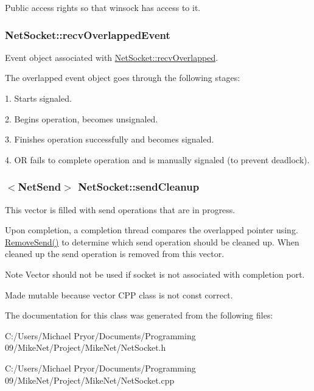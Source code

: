 Public access rights so that winsock has access to it. \hypertarget{class_net_socket_aeeae305cd0382ee87cf9c35aec571719}{
\subsubsection[{recvOverlappedEvent}]{ {\bf NetSocket::recvOverlappedEvent}}}
\label{class_net_socket_aeeae305cd0382ee87cf9c35aec571719}


Event object associated with \hyperlink{class_net_socket_ac260f690a6f192c22463d1f5ea903d96}{NetSocket::recvOverlapped}. 

The overlapped event object goes through the following stages: \par
 1. Starts signaled. \par
 2. Begins operation, becomes unsignaled. \par
 3. Finishes operation successfully and becomes signaled. \par
 4. OR fails to complete operation and is manually signaled (to prevent deadlock). \par
\par
 \hypertarget{class_net_socket_a84e789c6d2552eef894f1f751539233f}{
\subsubsection[{sendCleanup}]{$<${\bf NetSend}$>$ {\bf NetSocket::sendCleanup}}}
\label{class_net_socket_a84e789c6d2552eef894f1f751539233f}


This vector is filled with send operations that are in progress. 

Upon completion, a completion thread compares the overlapped pointer using. \hyperlink{class_net_socket_aedd848a5bbf20f92dcd2f2d68603a16a}{RemoveSend()} to determine which send operation should be cleaned up. When cleaned up the send operation is removed from this vector.

\begin{DoxyNote}{Note}
Vector should not be used if socket is not associated with completion port. 

Made mutable because vector CPP class is not const correct. 
\end{DoxyNote}


The documentation for this class was generated from the following files:\begin{DoxyCompactItemize}
\item 
C:/Users/Michael Pryor/Documents/Programming 09/MikeNet/Project/MikeNet/NetSocket.h\item 
C:/Users/Michael Pryor/Documents/Programming 09/MikeNet/Project/MikeNet/NetSocket.cpp\end{DoxyCompactItemize}
